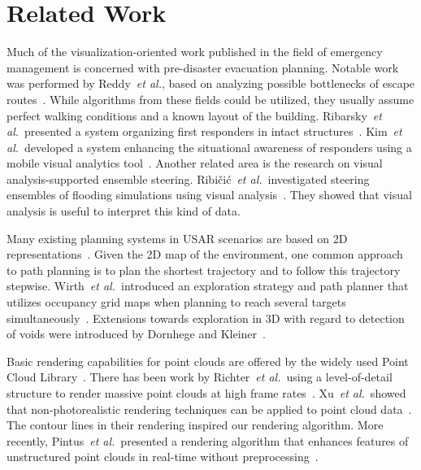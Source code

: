 \documentclass[conference,10pt,letter]{IEEEtran}
\def\etal{\textit{et al.}}
\begin{document}
\section{Related Work} \label{sec:relatedwork}
 Much of the visualization-oriented work published in the field of emergency management is concerned with pre-disaster evacuation planning. Notable work was performed by Reddy~\etal, based on analyzing possible bottlenecks of escape routes~\cite{EuroVA12:13-17:2012}. While algorithms from these fields could be utilized, they usually assume perfect walking conditions and a known layout of the building. Ribarsky~\etal\ presented a system organizing first responders in intact structures~\cite{Ribarsky:2010}. Kim~\etal\ developed a system enhancing the situational awareness of responders using a mobile visual analytics tool~\cite{Kim:2008}. Another related area is the research on visual analysis-supported ensemble steering. Ribi\v{c}i\'c~\etal\ investigated steering ensembles of flooding simulations using visual analysis~\cite{6280550}. They showed that visual analysis is useful to interpret this kind of data.

Many existing planning systems in USAR scenarios are based on 2D representations~\cite{kleiner_et_al_ssrr09,KohlbrecherMeyerStrykKlingaufFlexibleSlamSystem2011,Pellenz2009SMU}. Given the 2D map of the environment, one common approach to path planning is to plan the shortest trajectory and to follow this trajectory stepwise. Wirth~\etal\ introduced an exploration strategy and path planner that utilizes occupancy grid maps when planning to reach several targets simultaneously~\cite{Wirth2007ETA1}. Extensions towards exploration in 3D with regard to detection of voids were introduced by Dornhege and Kleiner~\cite{dornhege2011frontier}.

 Basic rendering capabilities for point clouds are offered by the widely used Point Cloud Library~\cite{Rusu11ICRA}. There has been work by Richter~\etal\ using a level-of-detail structure to render massive point clouds at high frame rates~\cite{Richter:2010:ORV:1811158.1811178}. Xu~\etal\ showed that non-photorealistic rendering techniques can be applied to point cloud data~\cite{conf/npar/XuC04}. The contour lines in their rendering inspired our rendering algorithm. More recently, Pintus~\etal\ presented a rendering algorithm that enhances features of unstructured point clouds in real-time without preprocessing~\cite{Pintus:2011:RRM:2384495.2384513}.
\end{document}
